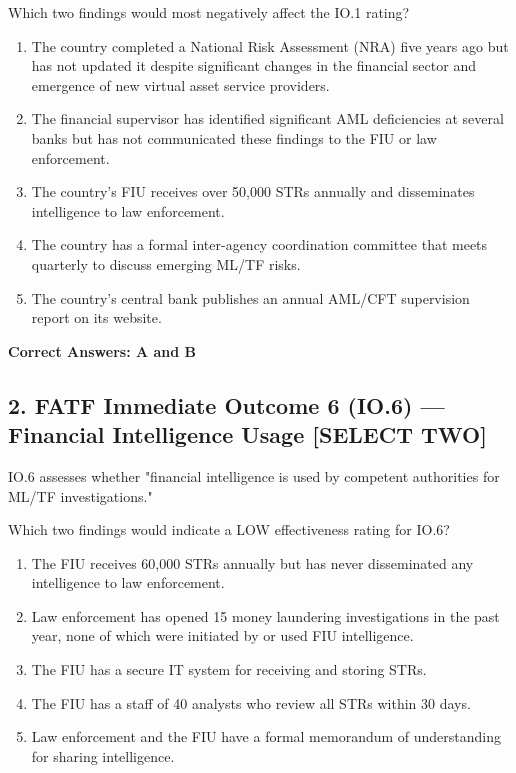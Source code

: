\documentclass[11pt,a4paper]{article}
\begin{document}
	Which two findings would most negatively affect the IO.1 rating?
	
	\begin{enumerate}[label=\Alph*.]
		\item The country completed a National Risk Assessment (NRA) five years ago but has not updated it despite significant changes in the financial sector and emergence of new virtual asset service providers.
		\item The financial supervisor has identified significant AML deficiencies at several banks but has not communicated these findings to the FIU or law enforcement.
		\item The country's FIU receives over 50,000 STRs annually and disseminates intelligence to law enforcement.
		\item The country has a formal inter-agency coordination committee that meets quarterly to discuss emerging ML/TF risks.
		\item The country's central bank publishes an annual AML/CFT supervision report on its website.
	\end{enumerate}
	
	\textbf{Correct Answers: A and B}
	
	\subsection{2. FATF Immediate Outcome 6 (IO.6) — Financial Intelligence Usage \textnormal{[SELECT TWO]}}
	
	IO.6 assesses whether "financial intelligence is used by competent authorities for ML/TF investigations."
	
	Which two findings would indicate a LOW effectiveness rating for IO.6?
	
	\begin{enumerate}[label=\Alph*.]
		\item The FIU receives 60,000 STRs annually but has never disseminated any intelligence to law enforcement.
		\item Law enforcement has opened 15 money laundering investigations in the past year, none of which were initiated by or used FIU intelligence.
		\item The FIU has a secure IT system for receiving and storing STRs.
		\item The FIU has a staff of 40 analysts who review all STRs within 30 days.
		\item Law enforcement and the FIU have a formal memorandum of understanding for sharing intelligence.
	\end{enumerate}
	
\end{document}
